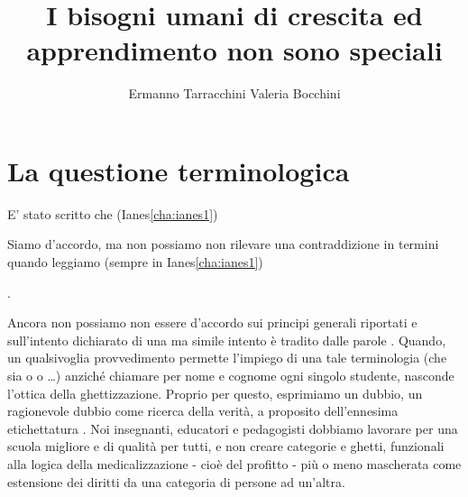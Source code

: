 \author{Ermanno Tarracchini  Valeria Bocchini}
\title{I bisogni umani di crescita ed apprendimento non sono speciali}
\label{cha:TarracchiniBocchini }
\maketitle
\section*{La questione terminologica}
E’ stato scritto che  (Ianes\ref{cha:ianes1})

Siamo d'accordo, ma non possiamo non rilevare una contraddizione in termini quando leggiamo (sempre in Ianes\ref{cha:ianes1})

.

Ancora non  possiamo non essere d'accordo sui principi generali riportati e sull'intento dichiarato di una   ma simile intento è tradito dalle parole . Quando, un qualsivoglia provvedimento permette  l'impiego di una tale terminologia  (che sia  o   o \dots) anziché chiamare per nome e cognome ogni singolo studente,  nasconde l'ottica della ghettizzazione. Proprio per questo, esprimiamo un dubbio, un ragionevole dubbio come ricerca della verità, a proposito  dell'ennesima etichettatura . Noi insegnanti, educatori e pedagogisti dobbiamo lavorare  per una scuola migliore e di qualità per tutti, e non creare categorie e ghetti, funzionali alla logica della medicalizzazione - cioè del profitto - più o meno mascherata come estensione dei diritti da una categoria di persone ad un'altra.
